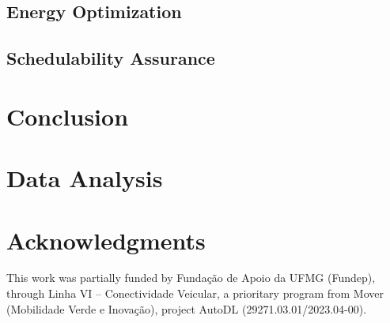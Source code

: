 \documentclass[conference]{IEEEtran}
\begin{document}
\subsection{Energy Optimization}

\subsection{Schedulability Assurance}

\section{Conclusion}

\section{Data Analysis}

\section*{Acknowledgments}
This work was partially funded by Fundação de Apoio da UFMG (Fundep), through Linha VI – Conectividade 
Veicular, a prioritary program from Mover (Mobilidade Verde e Inovação), project AutoDL (29271.03.01/2023.04-00).



\end{document}
